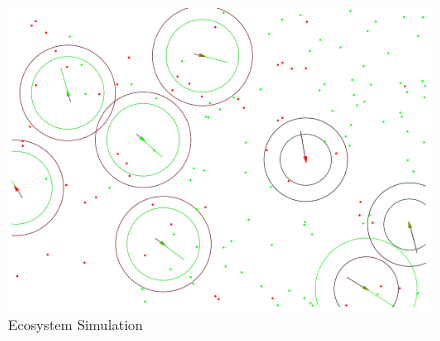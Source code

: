 \documentclass[conference]{IEEEtran}
\begin{document}
\begin{figure}
	\includegraphics[scale=0.329]{ecosystem.png}
	\caption{Ecosystem Simulation}
	\label{fig:ecosystem}
\end{figure}
\end{document}
